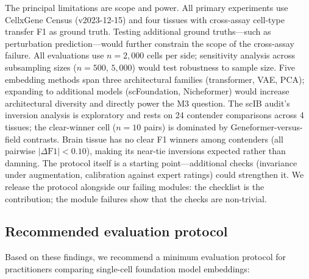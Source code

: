 \documentclass[10pt,letterpaper]{article}
\begin{document}
The principal limitations are scope and power. All primary experiments use CellxGene Census (v2023-12-15) and four tissues with cross-assay cell-type transfer F1 as ground truth. Testing additional ground truths---such as perturbation prediction---would further constrain the scope of the cross-assay failure. All evaluations use $n = 2{,}000$ cells per side; sensitivity analysis across subsampling sizes ($n = 500$, $5{,}000$) would test robustness to sample size. Five embedding methods span three architectural families (transformer, VAE, PCA); expanding to additional models (scFoundation, Nicheformer) would increase architectural diversity and directly power the M3 question. The scIB audit's inversion analysis is exploratory and rests on 24 contender comparisons across 4 tissues; the clear-winner cell ($n = 10$ pairs) is dominated by Geneformer-versus-field contrasts. Brain tissue has no clear F1 winners among contenders (all pairwise $|\Delta\text{F1}| < 0.10$), making its near-tie inversions expected rather than damning. The protocol itself is a starting point---additional checks (invariance under augmentation, calibration against expert ratings) could strengthen it. We release the protocol alongside our failing modules: the checklist is the contribution; the module failures show that the checks are non-trivial.

\subsection{Recommended evaluation protocol}

Based on these findings, we recommend a minimum evaluation protocol for practitioners comparing single-cell foundation model embeddings:
\end{document}
